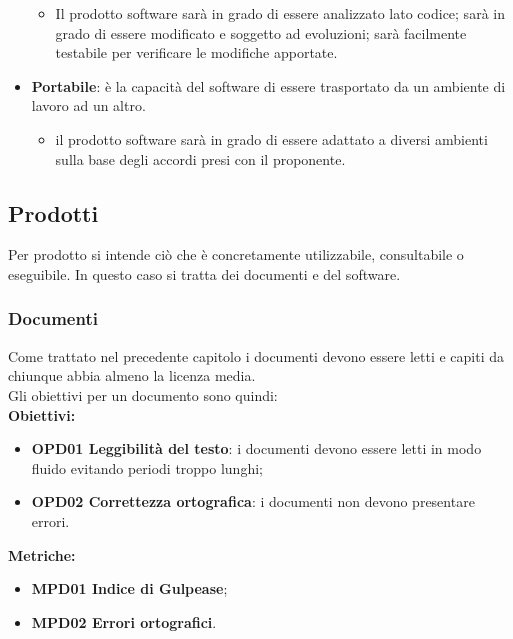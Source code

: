 \documentclass[../piano_di_qualifica.tex]{subfiles}
\begin{document}
\begin{itemize}
	      \begin{itemize}
		      \item Il prodotto software sarà in grado di essere analizzato lato codice; sarà in grado di essere modificato e soggetto ad evoluzioni; sarà facilmente testabile per verificare le modifiche apportate.
	      \end{itemize}
	\item \textbf{Portabile}: è la capacità del software di essere trasportato da un ambiente di lavoro ad un altro.
	      \begin{itemize}
		      \item il prodotto software sarà in grado di essere adattato a diversi ambienti sulla base degli accordi presi con il proponente.
	      \end{itemize}
\end{itemize}

\subsection{Prodotti}
Per prodotto si intende ciò che è concretamente utilizzabile, consultabile o eseguibile. In questo caso si tratta dei documenti e del software.

\subsubsection{Documenti}
Come trattato nel precedente capitolo i documenti devono essere letti e capiti da chiunque abbia almeno la licenza media.\\
Gli obiettivi per un documento sono quindi: \\

\setlength{\parindent}{0pt}\textbf{Obiettivi:}
\smallbreak
\begin{itemize}
	\item \textbf{OPD01 Leggibilità del testo}: i documenti devono essere letti in modo fluido evitando periodi troppo lunghi; \\
	\item \textbf{OPD02 Correttezza ortografica}: i documenti non devono presentare errori.
\end{itemize}

\textbf{Metriche:}
\smallbreak
\begin{itemize}
	\item \textbf{MPD01 Indice di Gulpease};
	\item \textbf{MPD02 Errori ortografici}.
\end{itemize}
\end{document}
